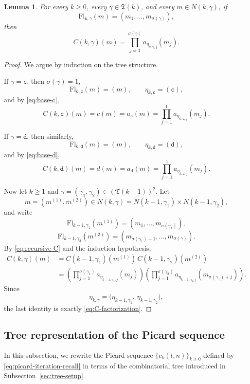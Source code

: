 \documentclass[12pt,reqno,tbtags]{amsart}
\newtheorem{lemma}{Lemma}[section]
\newcommand\1{\mathbbm{1}}
\begin{document}
\begin{lemma}\label{lem:C-factorization}
For every $k\geq 0$, every $\gamma\in\mathfrak T(k)$, and every
$m\in N(k,\gamma)$, if
\[
\mathrm{Fl}_{k,\gamma}(m)=(m_1,\dots,m_{\sigma(\gamma)}),
\]
then
\begin{equation}\label{eq:C-factorization}
C(k,\gamma)(m)
=
\prod_{j=1}^{\sigma(\gamma)}
a_{\eta_{k,\gamma,j}}(m_j).
\end{equation}
\end{lemma}

\begin{proof}
We argue by induction on the tree structure.

If $\gamma=\mathtt{c}$, then $\sigma(\gamma)=1$,
\[
\mathrm{Fl}_{k,\mathtt c}(m)=(m),
\qquad
\eta_{k,\mathtt c}=(\mathtt c),
\]
and by \eqref{eq:base-c},
\[
C(k,\mathtt c)(m)=c(m)=a_{\mathtt c}(m)
=
\prod_{j=1}^{1} a_{\eta_{k,\mathtt c,j}}(m_j).
\]

If $\gamma=\mathtt{d}$, then similarly,
\[
\mathrm{Fl}_{k,\mathtt d}(m)=(m),
\qquad
\eta_{k,\mathtt d}=(\mathtt d),
\]
and by \eqref{eq:base-d},
\[
C(k,\mathtt d)(m)=d(m)=a_{\mathtt d}(m)
=
\prod_{j=1}^{1} a_{\eta_{k,\mathtt d,j}}(m_j).
\]

Now let $k\geq 1$ and $\gamma=(\gamma_1,\gamma_2)\in(\mathfrak T(k-1))^2$.
Let
\[
m=(m^{(1)},m^{(2)})\in N(k,\gamma)
=
N(k-1,\gamma_1)\times N(k-1,\gamma_2),
\]
and write
\[
\mathrm{Fl}_{k-1,\gamma_1}(m^{(1)})
=
(m_1,\dots,m_{\sigma(\gamma_1)}),
\]
\[
\mathrm{Fl}_{k-1,\gamma_2}(m^{(2)})
=
(m_{\sigma(\gamma_1)+1},\dots,m_{\sigma(\gamma)}).
\]
By \eqref{eq:recursive-C} and the induction hypothesis,
\begin{align*}
C(k,\gamma)(m)
&=
C(k-1,\gamma_1)(m^{(1)})\,C(k-1,\gamma_2)(m^{(2)}) \\
&=
\left(
\prod_{j=1}^{\sigma(\gamma_1)}
a_{\eta_{k-1,\gamma_1,j}}(m_j)
\right)
\left(
\prod_{j=1}^{\sigma(\gamma_2)}
a_{\eta_{k-1,\gamma_2,j}}(m_{\sigma(\gamma_1)+j})
\right).
\end{align*}
Since
\[
\eta_{k,\gamma}
=
\bigl(\eta_{k-1,\gamma_1},\,\eta_{k-1,\gamma_2}\bigr),
\]
the last identity is exactly \eqref{eq:C-factorization}.
\end{proof}


\subsection{Tree representation of the Picard sequence}\label{sec:tree}

In this subsection, we rewrite the Picard sequence
$\{c_k(t,n)\}_{k\geq 0}$ defined by \eqref{eq:picard-iteration-recall}
in terms of the combinatorial tree introduced in
Subsection~\ref{sec:tree-setup}.
\end{document}
